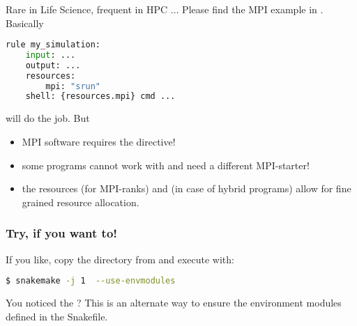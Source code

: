 \begin{frame}[fragile]
	\frametitle{}
	Rare in Life Science, frequent in HPC $\ldots$\newline
	Please find the MPI example in . Basically
	\begin{lstlisting}[language=Python,style=Python]
rule my_simulation:
    input: ...
    output: ...
    resources:
        mpi: "srun"
    shell: {resources.mpi} cmd ...
    \end{lstlisting}
    will do the job. But
    \begin{warning}
    	\begin{itemize}[<+->]
    		\item MPI software requires the  directive!
    		\item some programs cannot work with  and need a different MPI-starter!
    		\item the resources  (for MPI-ranks) and  (in case of hybrid programs) allow for fine grained resource allocation.
    	\end{itemize}
    \end{warning}
\end{frame}

\begin{frame}[fragile]
	\frametitle{Try, if you want to!}
	If you like, copy the  directory from  and execute with:
	\begin{lstlisting}[language=Bash, style=Shell]	
$ snakemake -j 1  --use-envmodules
    \end{lstlisting}
    \begin{hint}
    	You noticed the ? This is an alternate way to ensure the environment modules defined in the Snakefile.
    \end{hint}
\end{frame}
